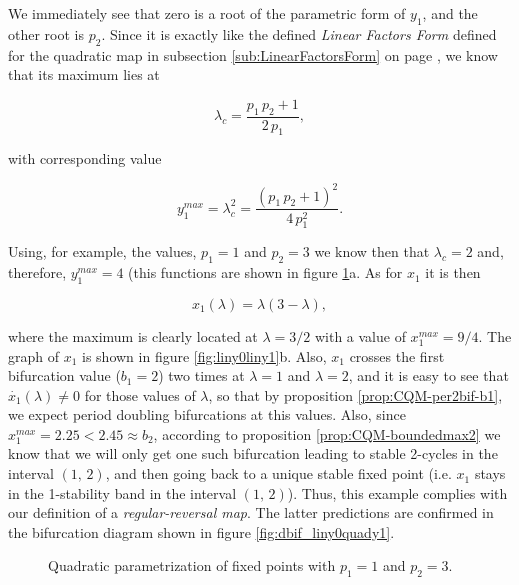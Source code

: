 \documentclass[10pt,twoside,titlepage]{book}
\numberwithin{equation}{chapter}
\numberwithin{figure}{chapter}
\numberwithin{table}{chapter}
\theoremstyle{plain}%
\theoremstyle{definition}
\theoremstyle{remark}
\begin{document}
We immediately see that zero is a root of the parametric form of $y_1$, and the other root is $p_2$. Since it is exactly like the defined \emph{Linear Factors Form} defined for the quadratic map in subsection \ref{sub:LinearFactorsForm} on page \pageref{sub:LinearFactorsForm}, we know that its maximum lies at

\[\lambda_c=\frac{p_1\,p_2+1}{2\,p_1},\]

with corresponding value

\[y_1^{max}=\lambda_c^2=\frac{(p_1\,p_2+1)^2}{4\,p_1^2}.\]

Using, for example, the values, $p_1=1$ and $p_2=3$ we know then that $\lambda_c=2$ and, therefore, $y_1^{max}=4$ (this functions are shown in figure \ref{fig:liny0quady1}a. As for $x_1$ it is then

\[x_1(\lambda)=\lambda (3 - \lambda),\]

where the maximum is clearly located at $\lambda=3/2$ with a value of $x_1^{max}=9/4$. The graph of $x_1$ is shown in figure \ref{fig:liny0liny1}b. Also, $x_1$ crosses the first bifurcation value ($b_1=2$) two times at $\lambda=1$ and $\lambda=2$, and it is easy to see that $\dot{x_1}(\lambda)\neq0$ for those values of $\lambda$, so that by proposition \ref{prop:CQM-per2bif-b1}, we expect period doubling bifurcations at this values. Also, since $x_1^{max}=2.25<2.45\approx b_2$, according to proposition \ref{prop:CQM-boundedmax2} we know that we will only get one such bifurcation leading to stable 2-cycles in the interval $(1,\,2)$, and then going back to a unique stable fixed point (i.e. $x_1$ stays in the 1-stability band in the interval $(1,\,2)$). Thus, this example complies with our definition of a \emph{regular-reversal map}. The latter predictions are confirmed in the bifurcation diagram shown in figure \ref{fig:dbif_liny0quady1}.

\begin{figure}
	\centering
	\caption{Quadratic parametrization of fixed points with $p_1=1$ and $p_2=3$.}
	\label{fig:liny0quady1}
\end{figure}
\end{document}
